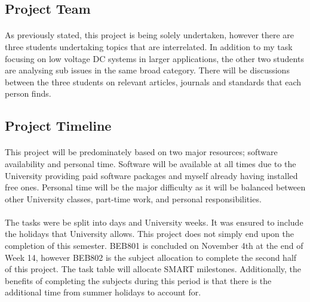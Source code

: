 
\subsection{Project Team}

\paragraph{}
As previously stated, this project is being solely undertaken, however there are three students undertaking topics that are interrelated. In addition to my task focusing on low voltage DC systems in larger applications, the other two students are analysing sub issues in the same broad category. There will be discussions between the three students on relevant articles, journals and standards that each person finds.

\newpage
\subsection{Project Timeline}

\paragraph{}
This project will be predominately based on two major resources; software availability and personal time. Software will be available at all times due to the University providing paid software packages and myself already having installed free ones. Personal time will be the major difficulty as it will be balanced between other University classes, part-time work, and personal responsibilities.   

\paragraph{}
The tasks were be split into days and University weeks. It was ensured to include the holidays that University allows. This project does not simply end upon the completion of this semester. BEB801 is concluded on November 4th at the end of Week 14, however BEB802 is the subject allocation to complete the second half of this project. The task table will allocate SMART milestones. Additionally, the benefits of completing the subjects during this period is that there is the additional time from summer holidays to account for.

